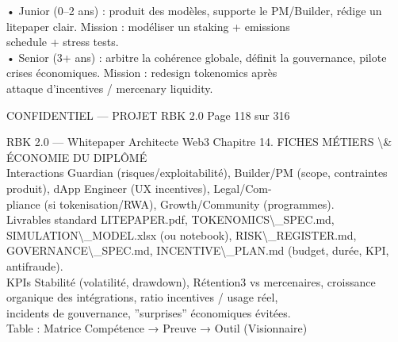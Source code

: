 \vspace{0.5em}
• Junior (0–2 ans) : produit des modèles, supporte le PM/Builder, rédige un litepaper clair. Mission : modéliser un staking + emissions\\
schedule + stress tests.\\
\vspace{0.5em}
• Senior (3+ ans) : arbitre la cohérence globale, définit la gouvernance, pilote crises économiques. Mission : redesign tokenomics après\\
attaque d’incentives / mercenary liquidity.\\
\vspace{0.5em}
\vspace{0.5em}
\vspace{0.5em}
\vspace{0.5em}
\begin{confidential}CONFIDENTIEL — PROJET RBK 2.0                               Page 118 sur 316\end{confidential}
RBK 2.0 — Whitepaper Architecte Web3                                                              Chapitre 14. FICHES MÉTIERS \textbackslash{}& ÉCONOMIE DU DIPLÔMÉ\\
\vspace{0.5em}
\vspace{0.5em}
Interactions Guardian (risques/exploitabilité), Builder/PM (scope, contraintes produit), dApp Engineer (UX incentives), Legal/Com-\\
pliance (si tokenisation/RWA), Growth/Community (programmes).\\
\vspace{0.5em}
Livrables  standard LITEPAPER.pdf, TOKENOMICS\textbackslash{}_SPEC.md, SIMULATION\textbackslash{}_MODEL.xlsx                                        (ou   notebook),   RISK\textbackslash{}_REGISTER.md,\\
GOVERNANCE\textbackslash{}_SPEC.md, INCENTIVE\textbackslash{}_PLAN.md (budget, durée, KPI, antifraude).\\
\vspace{0.5em}
\vspace{0.5em}
KPIs Stabilité (volatilité, drawdown), Rétention3 vs mercenaires, croissance organique des intégrations, ratio incentives / usage réel,\\
incidents de gouvernance, ”surprises” économiques évitées.\\
\vspace{0.5em}
Table : Matrice Compétence → Preuve → Outil (Visionnaire)\\
